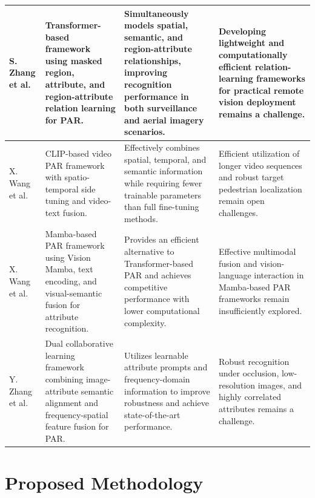 \documentclass{ieeeaccess}
\begin{document}
\begin{table}[htbp]
{\begin{tabular}{|p{2cm}|p{4cm}|p{4cm}|p{4cm}|}
                \hline
                S. Zhang et al.\cite{bib15} & Transformer-based framework using masked region, attribute, and region-attribute relation learning for PAR. & Simultaneously models spatial, semantic, and region-attribute relationships, improving recognition performance in both surveillance and aerial imagery scenarios. & Developing lightweight and computationally efficient relation-learning frameworks for practical remote vision deployment remains a challenge. \\
                \hline
                X. Wang et al.\cite{bib16} & CLIP-based video PAR framework with spatio-temporal side tuning and video-text fusion. & Effectively combines spatial, temporal, and semantic information while requiring fewer trainable parameters than full fine-tuning methods. & Efficient utilization of longer video sequences and robust target pedestrian localization remain open challenges.\\
                \hline
                 X. Wang et al.\cite{bib17} & Mamba-based PAR framework using Vision Mamba, text encoding, and visual-semantic fusion for attribute recognition. & Provides an efficient alternative to Transformer-based PAR and achieves competitive performance with lower computational complexity.& Effective multimodal fusion and vision-language interaction in Mamba-based PAR frameworks remain insufficiently explored. \\
                \hline
                Y. Zhang et al.\cite{bib18} & Dual collaborative learning framework combining image-attribute semantic alignment and frequency-spatial feature fusion for PAR. & Utilizes learnable attribute prompts and frequency-domain information to improve robustness and achieve state-of-the-art performance.& Robust recognition under occlusion, low-resolution images, and highly correlated attributes remains a challenge.\\
                \hline

            \end{tabular}
        }
    \end{table}

\section{Proposed Methodology}\label{sec:methodology}
\end{document}
